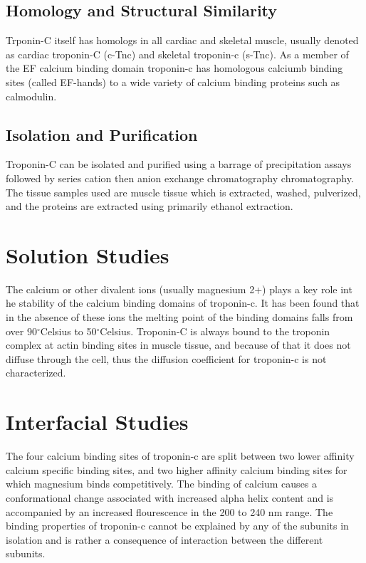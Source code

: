 \documentclass[12pt]{article}
\newcommand{\degrees}{{$^{\circ}$}}
\begin{document}
\subsection{Homology and Structural Similarity}
Trponin-C itself has homologs in all cardiac and skeletal muscle, usually denoted as cardiac troponin-C (c-Tnc) and skeletal troponin-c (s-Tnc). As a member of the EF calcium binding domain troponin-c has homologous calciumb binding sites (called EF-hands) to a wide variety of calcium binding proteins such as calmodulin.

\subsection{Isolation and Purification}
Troponin-C can be isolated and purified using a barrage of precipitation assays followed by series cation then anion exchange chromatography chromatography. The tissue samples used are muscle tissue which is extracted, washed, pulverized, and the proteins are extracted using primarily ethanol extraction.

\section{Solution Studies}
The calcium or other divalent ions (usually magnesium 2+) plays a key role int he stability of the calcium binding domains of troponin-c. It has been found that in the absence of these ions the melting point of the binding domains falls from over 90\degrees Celsius to 50\degrees Celsius. Troponin-C is always bound to the troponin complex at actin binding sites in muscle tissue, and because of that it does not diffuse through the cell, thus the diffusion coefficient for troponin-c is not characterized.

\section{Interfacial Studies}
The four calcium binding sites of troponin-c are split between two lower affinity calcium specific binding sites, and two higher affinity calcium binding sites for which magnesium binds competitively. The binding of calcium causes a conformational change associated with increased alpha helix content and is accompanied by an increased flourescence in the 200 to 240 nm range. The binding properties of troponin-c cannot be explained by any of the subunits in isolation and is rather a consequence of interaction between the different subunits.
\end{document}
